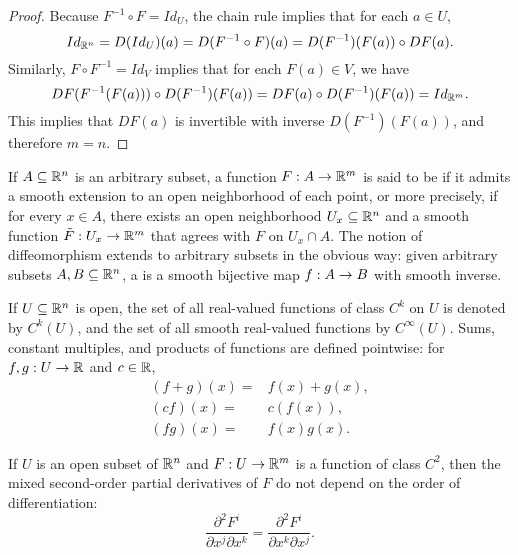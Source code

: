 \documentclass[11pt,a4paper]{article}
\begin{document}
\begin{proof}
Because $F^{-1}\circ F = Id_U$, the chain rule implies that for each $a\in U$, 
\begin{equation*}
Id_{\mathbb{R}^n} = D(Id_U)(a) = D(F^{-1}\circ F)(a) = D(F^{-1})(F(a))\circ DF(a).
\end{equation*}
Similarly, $F\circ F^{-1} = Id_V$ implies that for each $F(a)\in V$, we have 
\begin{equation*}
DF(F^{-1}(F(a)))\circ D(F^{-1})(F(a)) = DF(a)\circ D(F^{-1})(F(a)) = Id_{\mathbb{R}^m}.    
\end{equation*}
This implies that $DF(a)$ is invertible with inverse $D(F^{-1})(F(a))$, and therefore $m = n$.
\end{proof}

\begin{definition} \label{def:smoothness_on_arbitrary_domains}
If $A\subseteq \mathbb{R}^n$ is an arbitrary subset, a function $F:A\rightarrow \mathbb{R}^m$ is said to be  if it admits a smooth extension to an open neighborhood of each point, or more precisely, if for every $x\in A$, there exists an open neighborhood $U_x\subseteq \mathbb{R}^n$ and a smooth function $\Tilde{F}:U_x\rightarrow \mathbb{R}^m$ that agrees with $F$ on $U_x\cap A$. The notion of diffeomorphism extends to arbitrary subsets in the obvious way: given arbitrary subsets $A,B\subseteq \mathbb{R}^n$, a  is a smooth bijective map $f:A\rightarrow B$ with smooth inverse.
\end{definition}

\begin{definition}
If $U\subseteq \mathbb{R}^n$ is open, the set of all real-valued functions of class $C^k$ on $U$ is denoted by $C^k(U)$, and the set of all smooth real-valued functions by $C^\infty(U)$. Sums, constant multiples, and products of functions are defined pointwise: for $f,g:U\rightarrow \mathbb{R}$ and $c\in \mathbb{R}$,
\begin{align*}
    (f+g)(x) =& f(x) + g(x), \\
    (cf)(x) =& c(f(x)), \\
    (fg)(x) =& f(x)g(x).
\end{align*}
\end{definition}

\begin{proposition}
If $U$ is an open subset of $\mathbb{R}^n$ and $F:U\rightarrow \mathbb{R}^m$ is a function of class $C^2$, then the mixed second-order partial derivatives of $F$ do not depend on the order of differentiation:
\begin{equation*}
\dfrac{\partial^2 F^i}{\partial x^j\partial x^k} = \dfrac{\partial^2 F^i}{\partial x^k\partial x^j}.
\end{equation*}
\end{proposition}
\end{document}
